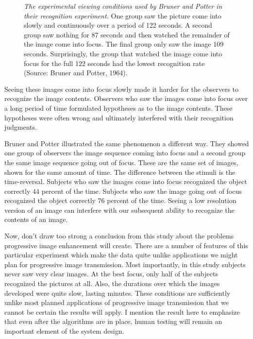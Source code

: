 \begin{figure}
\centerline{
}
\caption[Bruner and Potter]{
{\em The experimental viewing conditions used by Bruner and Potter in
their recognition experiment.}  One group saw the picture come into
slowly and continuously over a period of 122 seconds.  A second group
saw nothing for 87 seconds and then watched the remainder of the image
come into focus.  The final group only saw the image 109 seconds.
Surprisingly, the group that watched the image come into focus for the
full 122 seconds had the lowest recognition rate (Source: Bruner and
Potter, 1964).
}
\label{f7:bruner.potter}
\end{figure}

Seeing these images come into focus slowly made it harder for the
observers to recognize the image contents.  Observers who saw the
images come into focus over a long period of time formulated
hypotheses as to the image contents.  These hypotheses were often
wrong and ultimately interfered with their recognition judgments.

Bruner and Potter illustrated the same phenomenon a different way.
They showed one group of observers the image sequence coming into
focus and a second group the same image sequence going out of focus.
These are the same set of images, shown for the same amount of time.
The difference between the stimuli is the time-reversal.  Subjects who
saw the images come into focus recognized the object correctly $44$
percent of the time.  Subjects who saw the image going out of focus
recognized the object correctly $76$ percent of the time.  Seeing a
low resolution version of an image can interfere with our subsequent
ability to recognize the contents of an image.

Now, don't draw too strong a conclusion from this study about the
problems progressive image enhancement will create.  There are a
number of features of this particular experiment which make the data
quite unlike applications we might plan for progressive image
transmission.  Most importantly, in this study subjects never saw very
clear images.  At the best focus, only half of the subjects recognized
the pictures at all.  Also, the durations over which the images
developed were quite slow, lasting minutes.  These conditions are
sufficiently unlike most planned applications of progressive image
transmission that we cannot be certain the results will apply.  I
mention the result here to emphasize that even after the algorithms
are in place, human testing will remain an important element of the
system design.


